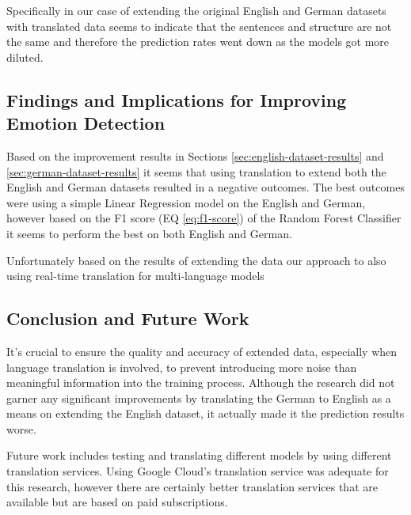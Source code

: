 \documentclass[11pt]{article}
\begin{document}
Specifically in our case of extending the original English and German datasets with translated data seems to indicate that the sentences and structure are not the same and therefore the prediction rates went down as the models got more diluted.

\subsection{Findings and Implications for Improving Emotion Detection}
Based on the improvement results in Sections \ref{sec:english-dataset-results} and \ref{sec:german-dataset-results} it seems that using translation to extend both the English and German datasets resulted in a negative outcomes. The best outcomes were using a simple Linear Regression model on the English and German, however based on the F1 score (EQ \ref{eq:f1-score}) of the Random Forest Classifier it seems to perform the best on both English and German. 

Unfortunately based on the results of extending the data our approach to also using real-time translation for multi-language models 

\subsection{Conclusion and Future Work}
It's crucial to ensure the quality and accuracy of extended data, especially when language translation is involved, to prevent introducing more noise than meaningful information into the training process. Although the research did not garner any significant improvements by translating the German to English as a means on extending the English dataset, it actually made it the prediction results worse.

Future work includes testing and translating different models by using different translation services. Using Google Cloud's translation service was adequate for this research, however there are certainly better translation services that are available but are based on paid subscriptions.

\clearpage
{}
\printbibliography
\clearpage


\listoffigures
\clearpage


\appendix
\end{document}
